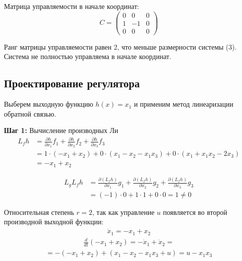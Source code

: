 Матрица управляемости в начале координат:
\begin{equation}
C = \begin{pmatrix} 0 & 0 & 0 \\ 1 & -1 & 0 \\ 0 & 0 & 0 \end{pmatrix}
\end{equation}

Ранг матрицы управляемости равен 2, что меньше размерности системы (3). Система не полностью управляема в начале координат.

\subsection*{Проектирование регулятора}

Выберем выходную функцию $h(x) = x_1$ и применим метод линеаризации обратной связью.

\textbf{Шаг 1:} Вычисление производных Ли
\begin{align}
L_f h &= \frac{\partial h}{\partial x_1} f_1 + \frac{\partial h}{\partial x_2} f_2 + \frac{\partial h}{\partial x_3} f_3 \\
&= 1 \cdot (-x_1 + x_2) + 0 \cdot (x_1 - x_2 - x_1 x_3) + 0 \cdot (x_1 + x_1 x_2 - 2x_3) \\
&= -x_1 + x_2
\end{align}

\begin{align}
L_g L_f h &= \frac{\partial (L_f h)}{\partial x_1} g_1 + \frac{\partial (L_f h)}{\partial x_2} g_2 + \frac{\partial (L_f h)}{\partial x_3} g_3 \\
&= (-1) \cdot 0 + 1 \cdot 1 + 0 \cdot 0 = 1 \neq 0
\end{align}

Относительная степень $r = 2$, так как управление $u$ появляется во второй производной выходной функции:
\begin{align}
\dot{x}_1 = -x_1 + x_2
\end{align}
\begin{align}
\frac{d}{dt}(-x_1 + x_2) = -\dot{x}_1 + \dot{x}_2 =
\end{align}
\begin{align}
  = -(-x_1 + x_2) + (x_1 - x_2 - x_1 x_3 + u) = u - x_1 x_3
\end{align}



